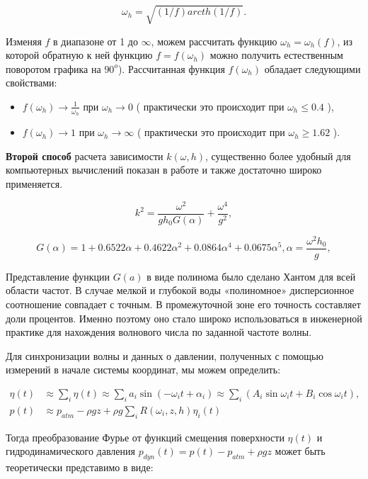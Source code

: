 $$
\omega_h = \sqrt{(1/f)arcth(1/f)}.
$$

Изменяя $f$ в диапазоне от 1 до $\infty$, можем рассчитать функцию $\omega_h=\omega_h(f)$, из которой обратную к ней функцию $f=f(\omega_h)$ можно получить естественным поворотом графика на $90^o$). Рассчитанная функция $f(\omega_h)$ обладает следующими свойствами:
\begin{itemize}
  \item $f(\omega_h)\rightarrow\frac{1}{\omega_h}$ при $\omega_h\rightarrow0$ ( практически это происходит при $\omega_h\leq0.4$ \cite{Zasl_Kras_2001}),
  \item $f(\omega_h)\rightarrow1$ при $\omega_h\rightarrow\infty$ ( практически это происходит при $\omega_h\geq1.62$ \cite{Zasl_Kras_2001}).
\end{itemize}

\textbf{Второй способ} расчета зависимости $k(\omega,h)$, существенно более удобный для компьютерных вычислений показан в работе \cite{hunt} и также достаточно широко применяется.

\begin{equation}\label{eq:hantApprox}
  k^2=\frac{\omega^2}{gh_0G(\alpha)}+\frac{\omega^4}{g^2},
\end{equation}

$$
G(\alpha)=1+0.6522\alpha+0.4622\alpha^2+0.0864\alpha^4+0.0675\alpha^5, \alpha=\frac{\omega^2h_0}{g},
$$

Представление функции $G(a)$ в виде полинома было сделано Хантом \cite{hunt} для всей области частот. В случае мелкой и глубокой воды «полиномное» дисперсионное соотношение совпадает с точным. В промежуточной зоне его точность составляет доли процентов. Именно поэтому оно стало широко использоваться в инженерной практике для нахождения волнового числа по заданной частоте волны.

Для синхронизации волны и данных о давлении, полученных с помощью измерений в начале системы координат, мы можем определить:

\begin{align}\label{eq:longeHigg}
\eta(t)&\approx\sum\limits_i\eta(t)\approx\sum\limits_ia_i\sin(-\omega_it+\alpha_i)\approx
\sum\limits_i(A_i\sin\omega_it+B_i\cos\omega_it),&\\
p(t)&\approx p_{atm}-\rho gz+\rho g\sum\limits_iR(\omega_i,z,h)\eta_i(t)
\end{align}

Тогда преобразование Фурье от функций смещения поверхности $\eta(t)$  и гидродинамического давления $p_{dyn}(t)=p(t)-p_{atm}+\rho gz$ может быть теоретически представимо \cite{Huang_Tsai_2008} в виде:

